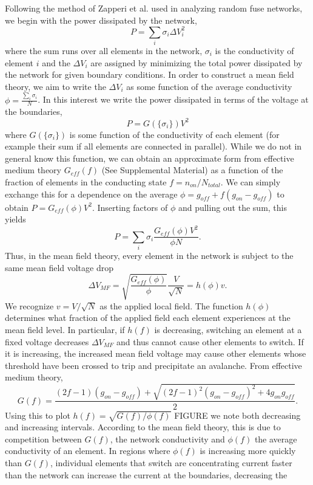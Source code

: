 \documentclass[aps,prl,preprint,groupedaddress]{revtex4-1}
\begin{document}
Following the method of Zapperi et al. \cite{Zapperi1999} used in analyzing
random fuse networks,
we begin with the power dissipated by the network,
\[P = \sum_i \sigma_i \Delta V_i^2\]
where the sum runs over all elements in the network, $\sigma_i$ is the 
conductivity of element $i$  and the $\Delta V_i$ are assigned by minimizing
the total power dissipated by the network for given boundary conditions.
In order to construct a mean field theory, we aim to write the $\Delta V_i$ as
some function of the average conductivity $\phi = \frac{\sum_i \sigma_i}{N}$.
In this interest we  write the power dissipated in terms of the voltage at
the boundaries,
\[P = G(\{\sigma_i\}) V^2\]
where $G(\{\sigma_i\})$ is some function of the conductivity of each element
(for example their sum if all elements are connected in parallel). While we
do not in general know this function, we can obtain an approximate form
from effective medium theory $G_{eff}(f)$ (See Supplemental Material) as a
function of the fraction of
elements in the conducting state $f = n_{on}/N_{total}$. We can simply
exchange this for a dependence on the average
\(\phi = g_{off} + f(g_{on} - g_{off})\) to obtain
$P = G_{eff}(\phi) V^2$. Inserting factors of $\phi$ and pulling out the sum,
this yields
\[P = \sum_i \sigma_i \frac{G_{eff}(\phi)V^2}{\phi N}.\]
Thus, in the mean field theory, every element in the network is subject to
the same mean field voltage drop
\[\Delta V_{MF} = \sqrt{\frac{G_{eff}(\phi)}{\phi}}\frac{V}{\sqrt{N}}
= h(\phi) v.\]
We recognize $v=V/\sqrt{N}$ as the applied local field.  The function
$h(\phi)$ determines what fraction of the applied field each element
experiences at the mean field level.  In particular, if $h(f)$ is decreasing,
switching an element at a fixed voltage decreases $\Delta V_{MF}$ and
thus cannot cause other elements to switch.  If it is increasing, the
increased mean field voltage may cause other elements whose threshold have
been crossed to trip and precipitate an avalanche. From effective medium
theory,
\[G(f) = \frac{(2f-1)(g_{on} - g_{off}) + \sqrt{(2f-1)^2
(g_{on} - g_{off})^2+ 4g_{on}g_{off}}}{2}.\]
Using this to plot $h(f) = \sqrt{G(f)/\phi(f)}$ FIGURE we note both decreasing
and increasing intervals.  According to the mean field theory, this is due
to competition between $G(f)$, the network conductivity and $\phi(f)$ the
average conductivity of an element.  In regions where $\phi(f)$ is increasing
more quickly than $G(f)$, individual elements that switch are concentrating
current faster
than the network can increase the current at the boundaries, decreasing the
\end{document}
